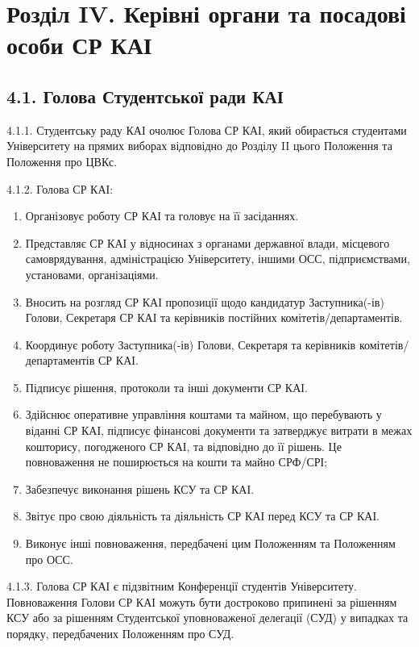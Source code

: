 \section*{Розділ IV. Керівні органи та посадові особи СР КАІ}

\subsection*{4.1. Голова Студентської ради КАІ}
    4.1.1. Студентську раду КАІ очолює Голова СР КАІ, який обирається студентами Університету на прямих виборах відповідно до Розділу II цього Положення та Положення про ЦВКс.

    4.1.2. Голова СР КАІ:

        \begin{enumerate}[label=\alph*)]
            \item Організовує роботу СР КАІ та головує на її засіданнях.
            \item Представляє СР КАІ у відносинах з органами державної влади, місцевого самоврядування, адміністрацією Університету, іншими ОСС, підприємствами, установами, організаціями.
            \item Вносить на розгляд СР КАІ пропозиції щодо кандидатур Заступника(-ів) Голови, Секретаря СР КАІ та керівників постійних комітетів/департаментів.
            \item Координує роботу Заступника(-ів) Голови, Секретаря та керівників комітетів/департаментів СР КАІ.
            \item Підписує рішення, протоколи та інші документи СР КАІ.
            \item Здійснює оперативне управління коштами та майном, що перебувають у віданні СР КАІ, підписує фінансові документи та затверджує витрати в межах кошторису, погодженого СР КАІ, та відповідно до її рішень. Це повноваження не поширюється на кошти та майно СРФ/СРІ;
            \item Забезпечує виконання рішень КСУ та СР КАІ.
            \item Звітує про свою діяльність та діяльність СР КАІ перед КСУ та СР КАІ.
            \item Виконує інші повноваження, передбачені цим Положенням та Положенням про ОСС.
        \end{enumerate}

    4.1.3. Голова СР КАІ є підзвітним Конференції студентів Університету. Повноваження Голови СР КАІ можуть бути достроково припинені за рішенням КСУ або за рішенням Студентської уповноваженої делегації (СУД) у випадках та порядку, передбачених Положенням про СУД.

